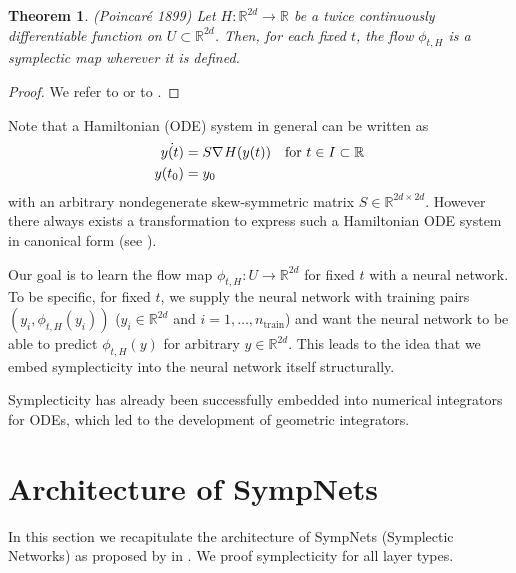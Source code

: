 \documentclass[twoside,a4paper]{article}
\newtheorem{theorem}{Theorem}
\begin{document}
\begin{theorem}(Poincaré 1899)
	Let $H: \mathbb{R}^{2d} \to \mathbb{R}$ be a twice continuously differentiable
	function on $U \subset \mathbb{R}^{2d}$. Then, for each fixed $t$, the flow
	$\phi_{t,H}$ is a symplectic map wherever it is defined.
\end{theorem}
\begin{proof}
	We refer to \citet[Theorem 2.4, p.~184]{hairer2006} 
	or to \citet[Theorem 1, p.~54]{leimkuhler_reich_2005}.
\end{proof}

Note that a Hamiltonian (ODE) system in general can be written as
\begin{align*}
	\dot{y(t)} &= S \nabla_{}{H}(y(t)) \quad \text{for } t \in I \subset \mathbb{R} \\
	y(t_0) &= y_0
\end{align*}
with an arbitrary nondegenerate skew-symmetric matrix $S \in \mathbb{R}^{2d \times 2d}$.
However there always exists a transformation to express such a Hamiltonian ODE system in
canonical form (see \citet[Remark 3.8]{peng2016}).

Our goal is to learn the flow map $\phi_{t,H} : U \to \mathbb{R}^{2d}$ for fixed $t$ with a neural network.
To be specific, for fixed $t$, we supply the neural network with training pairs $(y_i, \phi_{t,H}(y_i))$
($y_i \in \mathbb{R}^{2d}$ and $i=1, \dots, n_{\text{train}}$) and want the neural network
to be able to predict $\phi_{t,H}(y)$ for arbitrary $y \in \mathbb{R}^{2d}$.
This leads to the idea that we embed symplecticity into the neural network itself structurally.

Symplecticity has already been successfully embedded into numerical integrators for ODEs, which
led to the development of geometric integrators.

\section{Architecture of SympNets}

In this section we recapitulate the architecture of SympNets (Symplectic Networks) as
proposed by \citeauthor{Jin2020} in \cite{Jin2020}. We proof
symplecticity for all layer types.




\end{document}

